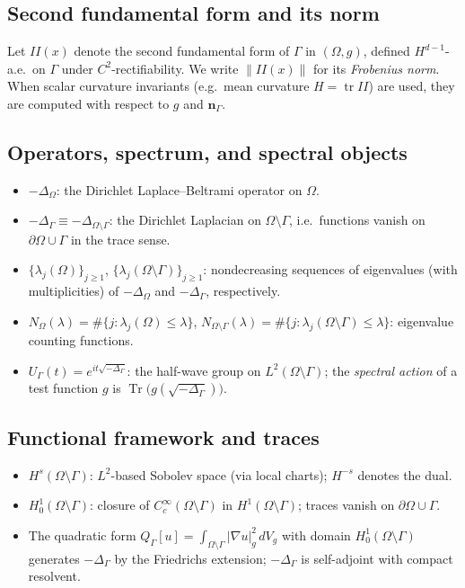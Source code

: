 \subsection{Second fundamental form and its norm}

Let $II(x)$ denote the second fundamental form of $\Gamma$ in $(\Omega,g)$,
defined $H^{d-1}$-a.e.\ on $\Gamma$ under $C^2$-rectifiability. We write
$\|II(x)\|$ for its \emph{Frobenius norm}. When scalar curvature invariants
(e.g.\ mean curvature $H=\operatorname{tr}II$) are used, they are computed with
respect to $g$ and $\mathbf{n}_\Gamma$.

\subsection{Operators, spectrum, and spectral objects}

\begin{itemize}
  \item $-\Delta_\Omega$: the Dirichlet Laplace--Beltrami operator on $\Omega$.
  \item $-\Delta_\Gamma \equiv -\Delta_{\Omega\setminus\Gamma}$: the Dirichlet
  Laplacian on $\Omega\setminus\Gamma$, i.e.\ functions vanish on
  $\partial\Omega\cup\Gamma$ in the trace sense.
  \item $\{\lambda_j(\Omega)\}_{j\ge1}$, $\{\lambda_j(\Omega\setminus\Gamma)\}_{j\ge1}$:
  nondecreasing sequences of eigenvalues (with multiplicities) of
  $-\Delta_\Omega$ and $-\Delta_\Gamma$, respectively.
  \item $N_\Omega(\lambda)=\#\{j:\lambda_j(\Omega)\le\lambda\}$, \;
        $N_{\Omega\setminus\Gamma}(\lambda)=\#\{j:\lambda_j(\Omega\setminus\Gamma)\le\lambda\}$:
        eigenvalue counting functions.
  \item $U_\Gamma(t)=e^{it\sqrt{-\Delta_\Gamma}}$: the half-wave group on
        $L^2(\Omega\setminus\Gamma)$; the \emph{spectral action} of a test function
        $g$ is $\operatorname{Tr}\!\big(g(\sqrt{-\Delta_\Gamma})\big)$.
\end{itemize}

\subsection{Functional framework and traces}

\begin{itemize}
  \item $H^s(\Omega\setminus\Gamma)$: $L^2$-based Sobolev space (via local charts);
        $H^{-s}$ denotes the dual.
  \item $H^1_0(\Omega\setminus\Gamma)$: closure of $C_c^\infty(\Omega\setminus\Gamma)$ in
        $H^1(\Omega\setminus\Gamma)$; traces vanish on $\partial\Omega\cup\Gamma$.
  \item The quadratic form $Q_\Gamma[u]=\int_{\Omega\setminus\Gamma}|\nabla u|_g^2\,dV_g$
        with domain $H^1_0(\Omega\setminus\Gamma)$ generates $-\Delta_\Gamma$ by the
        Friedrichs extension; $-\Delta_\Gamma$ is self-adjoint with compact resolvent.
\end{itemize}


